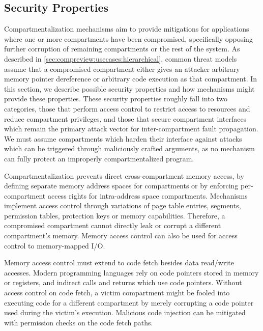 \subsection{Security Properties}
Compartmentalization mechanisms aim to provide mitigations for applications
where one or more compartments have been compromised, specifically opposing
further corruption of remaining compartments or the rest of the system.
As described in \autoref{sec:compreview:usecases:hierarchical}, common threat
models assume that a compromised compartment either gives an attacker arbitrary
memory pointer dereference or arbitrary code execution as that compartment.
In this section, we describe possible security properties and how mechanisms
might provide these properties.
These security properties roughly fall into two categories, those that
perform access control to restrict access to resources and reduce
compartment privileges, and those that secure compartment interfaces
which remain the primary attack vector for inter-compartment fault propagation.
We must assume compartments which harden their interface against attacks
which can be triggered through maliciously crafted arguments, as no
mechanism can fully protect an improperly compartmentalized program.


Compartmentalization prevents direct cross-compartment memory access, by 
defining separate memory address spaces for compartments or by 
enforcing per-compartment access rights for intra-address space compartments.
Mechanisms implement access control through variations of page table entries,
segments, permission tables, protection keys or memory capabilities.
Therefore, a compromised compartment cannot directly leak or corrupt a 
different compartment's memory.
Memory access control can also be used for access control to memory-mapped
I/O.

Memory access control must extend to code fetch besides data read/write
accesses.
Modern programming languages rely on code pointers stored in memory or
registers, and indirect calls and returns which use code pointers.
Without access control on code fetch, a victim compartment might be fooled 
into executing code for a different compartment by merely corrupting a
code pointer used during the victim's execution. 
Malicious code injection can be mitigated with permission checks on the
code fetch paths.

